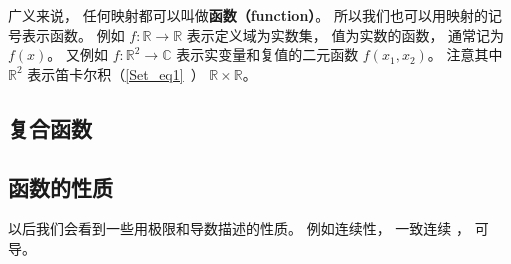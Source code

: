 

\begin{issues}
\issueDraft
\issueTODO
\end{issues}


广义来说， 任何映射都可以叫做\textbf{函数（function）}。 所以我们也可以用映射的记号表示函数。 例如 $f: \mathbb R \to \mathbb R$ 表示定义域为实数集， 值为实数的函数， 通常记为 $f(x)$。 又例如 $f: \mathbb R^2 \to \mathbb C$ 表示实变量和复值的二元函数 $f(x_1, x_2)$。 注意其中 $\mathbb R^2$ 表示笛卡尔积（\autoref{Set_eq1}~） $\mathbb R \times \mathbb R$。

\subsection{复合函数}

\subsection{函数的性质}
以后我们会看到一些用极限和导数描述的性质。 例如连续性， 一致连续 %
， 可导。
